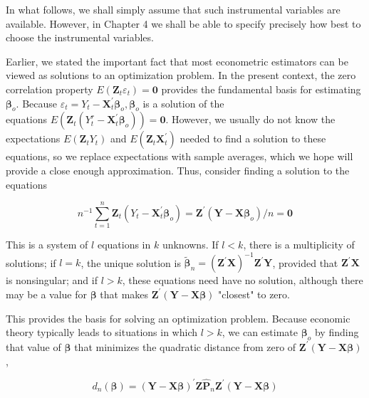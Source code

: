 \documentclass[10pt]{article}
\begin{document}
In what follows, we shall simply assume that such instrumental variables are available. However, in Chapter 4 we shall be able to specify precisely how best to choose the instrumental variables.

Earlier, we stated the important fact that most econometric estimators can be viewed as solutions to an optimization problem. In the present context, the zero correlation property $E\left(\mathbf{Z}_{t} \varepsilon_{t}\right)=\mathbf{0}$ provides the fundamental basis for estimating $\boldsymbol{\beta}_{o}$. Because $\varepsilon_{t}=Y_{t}-\mathbf{X}_{t}^{\prime} \boldsymbol{\beta}_{o}, \boldsymbol{\beta}_{o}$ is a solution of the\\
equations $E\left(\mathbf{Z}_{t}\left(Y_{t}^{r}-\mathbf{X}_{t}^{\prime} \boldsymbol{\beta}_{o}\right)\right)=\mathbf{0}$. However, we usually do not know the expectations $E\left(\mathbf{Z}_{t} Y_{t}\right)$ and $E\left(\mathbf{Z}_{t} \mathbf{X}_{t}^{\prime}\right)$ needed to find a solution to these equations, so we replace expectations with sample averages, which we hope will provide a close enough approximation. Thus, consider finding a solution to the equations

$$
n^{-1} \sum_{t=1}^{n} \mathbf{Z}_{t}\left(Y_{t}-\mathbf{X}_{t}^{\prime} \boldsymbol{\beta}_{o}\right)=\mathbf{Z}^{\prime}\left(\mathbf{Y}-\mathbf{X} \boldsymbol{\beta}_{o}\right) / n=\mathbf{0}
$$

This is a system of $l$ equations in $k$ unknowns. If $l<k$, there is a multiplicity of solutions; if $l=k$, the unique solution is $\tilde{\boldsymbol{\beta}}_{n}=\left(\mathbf{Z}^{\prime} \mathbf{X}\right)^{-1} \mathbf{Z}^{\prime} \mathbf{Y}$, provided that $\mathbf{Z}^{\prime} \mathbf{X}$ is nonsingular; and if $l>k$, these equations need have no solution, although there may be a value for $\boldsymbol{\beta}$ that makes $\mathbf{Z}^{\prime}(\mathbf{Y}-\mathbf{X} \boldsymbol{\beta})$ "closest" to zero.

This provides the basis for solving an optimization problem. Because economic theory typically leads to situations in which $l>k$, we can estimate $\boldsymbol{\beta}_{o}$ by finding that value of $\boldsymbol{\beta}$ that minimizes the quadratic distance from zero of $\mathbf{Z}^{\prime}(\mathbf{Y}-\mathbf{X} \boldsymbol{\beta})$,

$$
d_{n}(\boldsymbol{\beta})=(\mathbf{Y}-\mathbf{X} \boldsymbol{\beta})^{\prime} \mathbf{Z} \hat{\mathbf{P}}_{n} \mathbf{Z}^{\prime}(\mathbf{Y}-\mathbf{X} \boldsymbol{\beta})
$$
\end{document}
